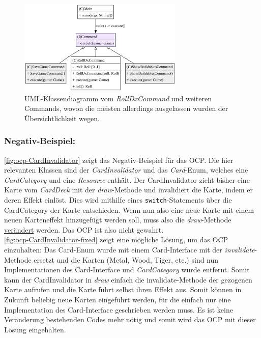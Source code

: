 \begin{figure}[H]
	\centering
	\includegraphics[width=0.7\textwidth]{Bilder/RollDxCommand_structure.pdf} 
	\caption{UML-Klassendiagramm vom \textit{RollDxCommand} und weiteren Commands, 
	wovon die meisten allerdings ausgelassen wurden der Übersichtlichkeit wegen.}
	\label{fig:ocp-rolldx}
\end{figure} 

\subsubsection{Negativ-Beispiel:}

\autoref{fig:ocp-CardInvalidator} zeigt das Negativ-Beispiel für das OCP. Die hier relevanten Klassen sind 
der \textit{CardInvalidator} und das \textit{Card}-Enum, welches eine \textit{CardCategory} und eine \textit{Resource} enthält. 
Der CardInvalidator zieht bisher eine Karte vom \textit{CardDeck} mit der \textit{draw}-Methode und invalidiert die Karte,
indem er deren Effekt einlöst. Dies wird mithilfe eines \texttt{switch}-Statements über die CardCategory der Karte entschieden.
Wenn nun also eine neue Karte mit einem neuen Karteneffekt hinzugefügt werden soll, muss also die \textit{draw}-Methode 
\underline{verändert} werden. Das OCP ist also nicht gewahrt. \\
\autoref{fig:ocp-CardInvalidator-fixed} zeigt eine mögliche Lösung, um das OCP einzuhalten: 
Das Card-Enum wurde mit einem Card-Interface mit der \textit{invalidate}-Methode ersetzt 
und die Karten (Metal, Wood, Tiger, etc.) sind nun Implementationen des Card-Interface und \textit{CardCategory} wurde entfernt.
Somit kann der CardInvalidator in 
\textit{draw} einfach die invalidate-Methode der gezogenen Karte aufrufen und die Karte führt selbst ihren Effekt aus. 
Somit können in Zukunft beliebig neue Karten eingeführt werden, für die einfach nur eine Implementation des Card-Interface 
geschrieben werden muss. Es ist keine Veränderung bestehenden Codes mehr nötig und somit wird das OCP mit dieser Lösung eingehalten.


